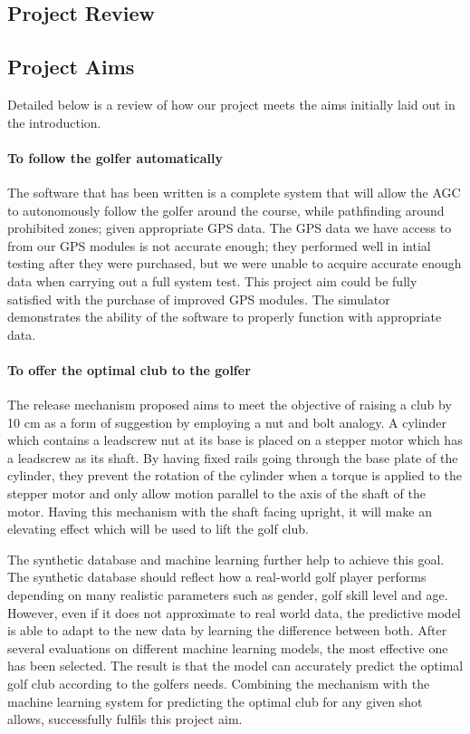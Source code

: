 \documentclass[11pt,landscape]{article}
\begin{document}
\begin{multicols}{3}
\section{Project Review}
\subsection{Project Aims}
Detailed below is a review of how our project meets the aims initially laid out
in the introduction.
\paragraph{To follow the golfer automatically}
The software that has been written is a complete system that will allow the AGC
to autonomously follow the golfer around the course, while pathfinding around
prohibited zones; given appropriate GPS data. The GPS data we have access to
from our GPS modules is not accurate enough; they performed well in intial
testing after they were purchased, but we were unable to acquire accurate enough
data when carrying out a full system test. This project aim could be fully
satisfied with the purchase of improved GPS modules. The simulator demonstrates
the ability of the software to properly function with appropriate data.

\paragraph{To offer the optimal club to the golfer}
The release mechanism proposed aims to meet the objective of raising a club by
10 cm as a form of suggestion by employing a nut and bolt analogy. A cylinder
which contains a leadscrew nut at its base is placed on a stepper motor which
has a leadscrew as its shaft. By having fixed rails going through the base plate
of the cylinder, they prevent the rotation of the cylinder when a torque is
applied to the stepper motor and only allow motion parallel to the axis of the
shaft of the motor. Having this mechanism with the shaft facing upright, it will
make an elevating effect which will be used to lift the golf club.

The synthetic database and machine learning further help to achieve this goal.
The synthetic database should reflect how a real-world golf player performs
depending on many realistic parameters such as gender, golf skill level and age.
However, even if it does not approximate to real world data, the predictive
model is able to adapt to the new data by learning the difference between both.
After several evaluations on different machine learning models, the most
effective one has been selected. The result is that the model can accurately
predict the optimal golf club according to the golfers needs. Combining the
mechanism with the machine learning system for predicting the optimal club for
any given shot allows, successfully fulfils this project aim.



\end{multicols}
\end{document}
